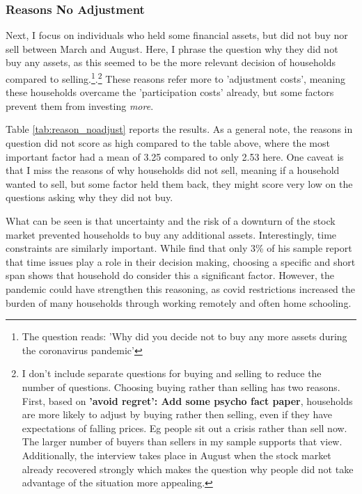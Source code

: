 \documentclass[ProjectABM]{subfiles}
\begin{document}
\subsubsection{Reasons No Adjustment}
Next, I focus on individuals who held some financial assets, but did not buy nor sell between March and August. Here, I phrase the question why they did not buy any assets, as this seemed to be the more relevant decision of households compared to selling.\footnote{The question reads: 'Why did you decide not to buy any more assets during the coronavirus pandemic'}.\footnote{I don't include separate questions for buying and selling to reduce the number of questions. Choosing buying rather than selling has two reasons. First, based on \textbf{'avoid regret': Add some psycho fact paper}, households are more likely to adjust by buying rather then selling, even if they have expectations of falling prices. Eg people sit out a crisis rather than sell now. The larger number of buyers than sellers in my sample supports that view. Additionally, the interview takes place in August when the stock market already recovered strongly which makes the question why people did not take advantage of the situation more appealing.} These reasons refer more to 'adjustment costs', meaning these households overcame the 'participation costs' already, but some factors prevent them from investing \textit{more}.%



Table \ref{tab:reason_noadjust} reports the results. As a general note, the reasons in question did not score as high compared to the table above, where the most important factor had a mean of 3.25 compared to only 2.53 here. %
One caveat is that I miss the reasons of why households did not sell, meaning if a household wanted to sell, but some factor held them back, they might score very low on the questions asking why they did not buy. 

What can be seen is that uncertainty and the risk of a downturn of the stock market prevented households to buy any additional assets. %
Interestingly, time constraints are similarly important. While \cite{choi_2020} find that only 3\% of his sample report that time issues play a role in their decision making, choosing a specific and short span shows that household do consider this a significant factor. However, the pandemic could have strengthen this reasoning, as covid restrictions increased the burden of many households through working remotely and often home schooling.
\end{document}
